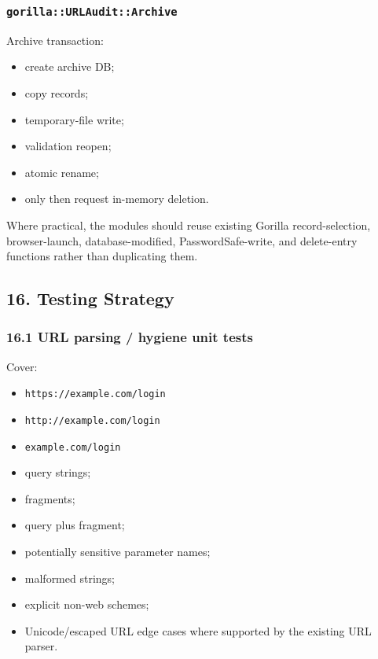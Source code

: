 \documentclass[
  letterpaper,
]{article}
\providecommand{\tightlist}{%
  \setlength{\itemsep}{0pt}\setlength{\parskip}{0pt}}
\begin{document}
\subsubsection{\texorpdfstring{\nolinkurl{gorilla::URLAudit::Archive}}{}}\label{gorillaurlauditarchive}

Archive transaction:

\begin{itemize}
\tightlist
\item
  create archive DB;
\item
  copy records;
\item
  temporary-file write;
\item
  validation reopen;
\item
  atomic rename;
\item
  only then request in-memory deletion.
\end{itemize}

Where practical, the modules should reuse existing Gorilla record-selection, browser-launch, database-modified,
PasswordSafe-write, and delete-entry functions rather than duplicating them.

\subsection{16. Testing Strategy}\label{16-testing-strategy}

\subsubsection{16.1 URL parsing / hygiene unit tests}\label{161-url-parsing--hygiene-unit-tests}

Cover:

\begin{itemize}
\tightlist
\item
  \nolinkurl{https://example.com/login}
\item
  \nolinkurl{http://example.com/login}
\item
  \nolinkurl{example.com/login}
\item
  query strings;
\item
  fragments;
\item
  query plus fragment;
\item
  potentially sensitive parameter names;
\item
  malformed strings;
\item
  explicit non-web schemes;
\item
  Unicode/escaped URL edge cases where supported by the existing URL parser.
\end{itemize}
\end{document}
